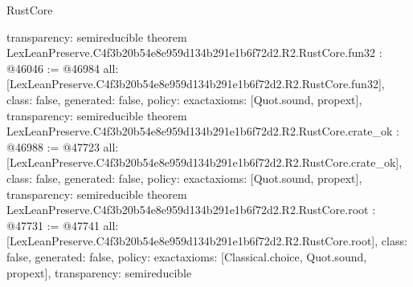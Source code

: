 \begin{lexlean}{RustCore}
\begin{coremodule}
{  transparency: semireducible
}
theorem LexLeanPreserve.C4f3b20b54e8e959d134b291e1b6f72d2.R2.RustCore.fun32 : @46046 := @46984 {
  all: [LexLeanPreserve.C4f3b20b54e8e959d134b291e1b6f72d2.R2.RustCore.fun32],
  class: false,
  generated: false,
  policy: exact{axioms: [Quot.sound, propext]},
  transparency: semireducible
}
theorem LexLeanPreserve.C4f3b20b54e8e959d134b291e1b6f72d2.R2.RustCore.crate_ok : @46988 := @47723 {
  all: [LexLeanPreserve.C4f3b20b54e8e959d134b291e1b6f72d2.R2.RustCore.crate_ok],
  class: false,
  generated: false,
  policy: exact{axioms: [Quot.sound, propext]},
  transparency: semireducible
}
theorem LexLeanPreserve.C4f3b20b54e8e959d134b291e1b6f72d2.R2.RustCore.root : @47731 := @47741 {
  all: [LexLeanPreserve.C4f3b20b54e8e959d134b291e1b6f72d2.R2.RustCore.root],
  class: false,
  generated: false,
  policy: exact{axioms: [Classical.choice, Quot.sound, propext]},
  transparency: semireducible
}


\end{coremodule}
\end{lexlean}

